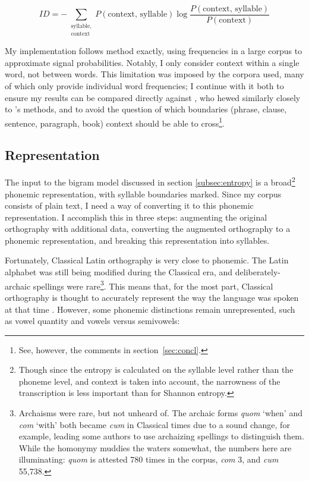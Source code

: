 \documentclass[12pt,twoside]{article}
\begin{document}
\begin{equation}
\label{eq:id}
ID = - \sum_{\substack{\textrm{syllable},\\\textrm{context}}} P(\textrm{context, syllable}) \log \frac{P(\textrm{context, syllable})}{P(\textrm{context})}
\end{equation}

My implementation follows  method exactly, using frequencies in a large corpus to approximate signal probabilities. Notably, I only consider context within a single word, not between words. This limitation was imposed by the corpora \citeauthor{oh} used, many of which only provide individual word frequencies; I continue with it both to ensure my results can be compared directly against , who hewed similarly closely to \citeauthor{oh}'s methods, and to avoid the question of which boundaries (phrase, clause, sentence, paragraph, book) context should be able to cross\footnote{See, however, the comments in section~\ref{sec:concl}.}.

\subsection{Representation}
\label{subsec:repr}

The input to the bigram model discussed in section \ref{subsec:entropy} is a broad\footnote{Though since the entropy is calculated on the syllable level rather than the phoneme level, and context is taken into account, the narrowness of the transcription is less important than for Shannon entropy.} phonemic representation, with syllable boundaries marked. Since my corpus consists of plain text, I need a way of converting it to this phonemic representation. I accomplish this in three steps: augmenting the original orthography with additional data, converting the augmented orthography to a phonemic representation, and breaking this representation into syllables.

Fortunately, Classical Latin orthography is very close to phonemic. The Latin alphabet was still being modified during the Classical era, and deliberately-archaic spellings were rare\footnote{Archaisms were rare, but not unheard of. The archaic forms \emph{quom} `when' and \emph{com} `with' both became \emph{cum} in Classical times due to a sound change, for example, leading some authors to use archaizing spellings to distinguish them. While the homonymy muddies the waters somewhat, the numbers here are illuminating: \emph{quom} is attested 780 times in the corpus, \emph{com} 3, and \emph{cum} 55,738.}. This means that, for the most part, Classical orthography is thought to accurately represent the way the language was spoken at that time \citep[9]{allen}. However, some phonemic distinctions remain unrepresented, such as vowel quantity and vowels versus semivowels:
\end{document}
